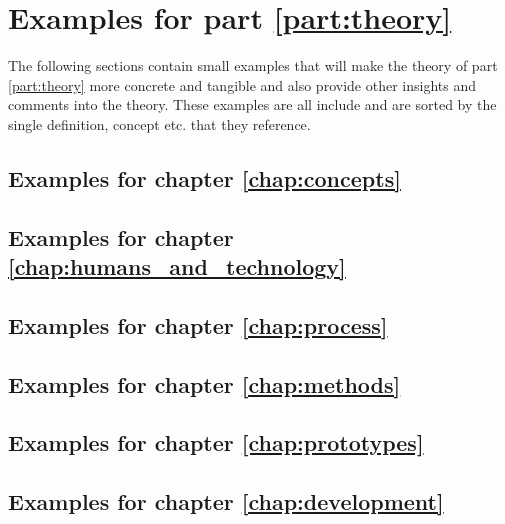 \chapter{Examples for part \ref{part:theory}} \label{chap:theory_examples}
The following sections contain small examples that will make the theory of part \ref{part:theory} more concrete and tangible and also provide other insights and comments into the theory. These examples are all include and are sorted by the single definition, concept etc. that they reference.

\vfill \minitoc \newpage

\section{Examples for chapter \ref{chap:concepts}} \label{chap:concepts_examples}

\section{Examples for chapter \ref{chap:humans_and_technology}} \label{chap:humans_and_technology_examples}

\section{Examples for chapter \ref{chap:process}} \label{chap:process_examples}

\section{Examples for chapter \ref{chap:methods}} \label{chap:methods_examples}

\section{Examples for chapter \ref{chap:prototypes}} \label{chap:prototypes_examples}

\section{Examples for chapter \ref{chap:development}} \label{chap:development_examples}


